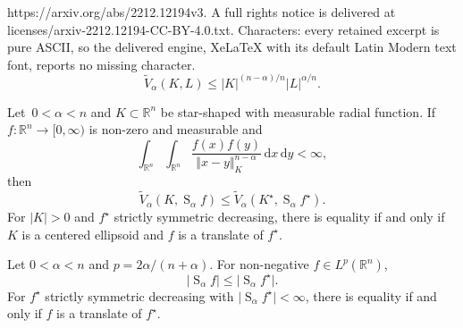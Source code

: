 \documentclass[10pt,a4paper]{amsart}
\newcommand{\R}{\mathbb R}
\newcommand{\hls}[1]{\operatorname{S}_{#1}\!} %
\newcommand{\vol}[1]{\vert #1\vert}
\renewcommand{\d}{\,\mathrm{d}}
\begin{document}
https://arxiv.org/abs/2212.12194v3. A full rights notice is delivered at licenses/arxiv-2212.12194-CC-BY-4.0.txt. Characters: every retained excerpt is pure ASCII, so the delivered engine, XeLaTeX with its default Latin Modern text font, reports no missing character.
\begin{equation}
    \label{eq_mixedvolume}
    \tilde V_{\alpha}(K,L) \leq \vol{K}^{({n-\alpha})/n} \vol{L}^{ \alpha/n}.
\end{equation}

\begin{lemma}\label{lem_smooth_compact_support_Riesz}
Let  $\,0<\alpha<n$ and $K\subset\R^n$ be star-shaped with measurable radial function. If  $
f:\R^n\to[0,\infty)$ is non-zero and measurable
 and
\begin{equation}
\int_{\R^n}\int_{\R^n} \frac{f(x) f(y)}{\Vert x-y\Vert_K^{n-\alpha}} \d x \d y<\infty,
\end{equation}
then
\begin{equation}
\tilde V_\alpha(K, \hls\alpha f) \leq \tilde V_\alpha(K^\star, \hls\alpha f^\star).
\end{equation}
For $\vol{K}>0$ and $f^\star$ strictly symmetric decreasing, there is equality if and only if $K$ is a centered ellipsoid and $f$ is a translate of $f^\star$.
\end{lemma}

\begin{lemma}\label{lem_new_rearrangement}
Let $0<\alpha<n$ and $p=2\alpha/(n+\alpha)$.
For non-negative $f\in L^p(\R^n)$, 
	\begin{equation}
	\vol{\hls\alpha f} \leq \vol{\hls\alpha f^\star}.
	\end{equation}
For $f^\star$ strictly symmetric decreasing with $\vol{\hls \alpha f^\star}<\infty$,
there is equality if and only if $f$ is a translate of $f^\star$.
\end{lemma}
\end{document}
